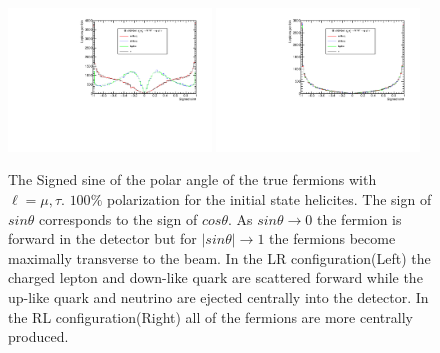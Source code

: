 \begin{figure}


\includegraphics[width=0.48\textwidth]{hsLR.pdf}
\includegraphics[width=0.48\textwidth]{hsRL.pdf}
\caption{The Signed sine of the polar angle of the true fermions with $\ell = \mu,\tau$. $100\%$ polarization for the initial state helicites. The sign of $sin\theta$ corresponds to the sign of $cos\theta$. As $sin\theta \rightarrow 0$ the fermion is forward in the detector but for $|sin\theta| \rightarrow 1$ the fermions become maximally transverse to the beam. In the LR configuration(Left) the charged lepton and down-like quark are scattered forward while the up-like quark and neutrino are ejected centrally into the detector. In the RL configuration(Right) all of the fermions are more centrally produced. }
\label{fig:fangles}
\end{figure}

